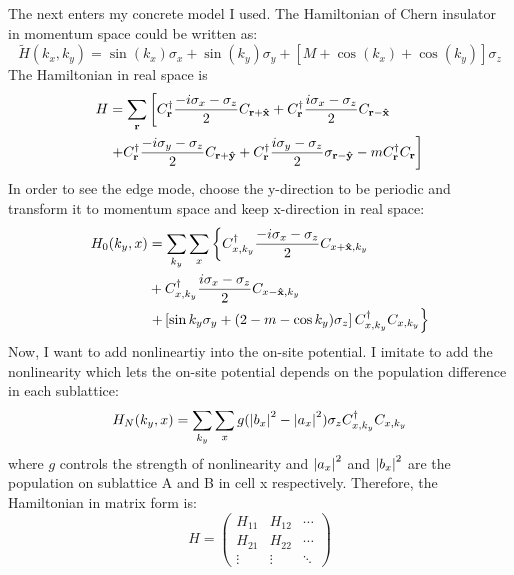 \documentclass[fontsize=11pt, %
                             paper=a4, %
                             twoside, %
                             captions=tableheading,
                             index=totoc,
                             hyperref]{labbook}
\begin{document}
\begin{addmargin}[4cm]{0cm}
The next enters my concrete model I used. The Hamiltonian of Chern insulator in momentum space could be written as:
\begin{equation}
\tilde{H}(k_x,k_y)=\sin(k_x)\sigma_x+\sin(k_y)\sigma_y+\left[M+\cos(k_x)+\cos(k_y)\right]\sigma_z
\end{equation}
The Hamiltonian in real space is
\begin{equation}
\begin{aligned}
H&=\sum_{\mathbf{r}} \left[C^\dagger_{\mathbf{r}}\frac{-i\sigma_x-\sigma_z}{2}C_{\mathbf{r}+\mathbf{\hat{x}}} + C^\dagger_{\mathbf{r}}\frac{i\sigma_x-\sigma_z}{2}C_{\mathbf{r}-\mathbf{\hat{x}}} \right. \\
&\left.+ C^\dagger_{\mathbf{r}}\frac{-i\sigma_y-\sigma_z}{2}C_{\mathbf{r}+\mathbf{\hat{y}}} + C^\dagger_{\mathbf{r}}\frac{i\sigma_y-\sigma_z}{2}\sigma_{\mathbf{r}-\mathbf{\hat{y}}}-mC_{\mathbf{r}}^\dagger C_{\mathbf{r}}\right]
\end{aligned}
\end{equation}
In order to see the edge mode, choose the y-direction to be periodic and transform it to momentum space and keep x-direction in real space:
\begin{equation}
\begin{aligned}
H_0(k_y,x)&=\sum_{k_y}\sum_x \left\{ C_{x,k_y}^\dagger \frac{-i\sigma_x-\sigma_z}{2} C_{x+\mathbf{\hat{x}},k_y}\right.\\
&+C^\dagger_{x,k_y}\frac{i\sigma_x-\sigma_z}{2}C_{x-\mathbf{\hat{x}},  k_y}\\
&\left. +\left[\sin k_y \sigma_y + (2-m-\cos k_y)\sigma_z\right]C_{x,k_y}^\dagger C_{x,k_y}\right\}
\end{aligned}
\end{equation}
Now, I want to  add nonlineartiy into the on-site potential. I imitate to add the nonlinearity which lets the on-site potential depends on the population difference in each sublattice:
\begin{equation}
H_N(k_y,x)=\sum_{k_y}\sum_x g(\left| b_x \right|^2-\left| a_x \right|^2)\sigma_z C^\dagger_{x,k_y}C_{x,k_y}
\end{equation}
where $g$ controls the strength of nonlinearity and $\left| a_x \right|^2$ and $\left| b_x \right|^2$ are the population on sublattice A and B in cell x respectively. Therefore, the Hamiltonian in matrix form is:
\begin{equation}
H=
\begin{pmatrix}
H_{11}&H_{12}&\cdots\\
H_{21}&H_{22}&\cdots\\
\vdots&\vdots&\ddots
\end{pmatrix}
\end{equation}

\end{addmargin}
\end{document}

